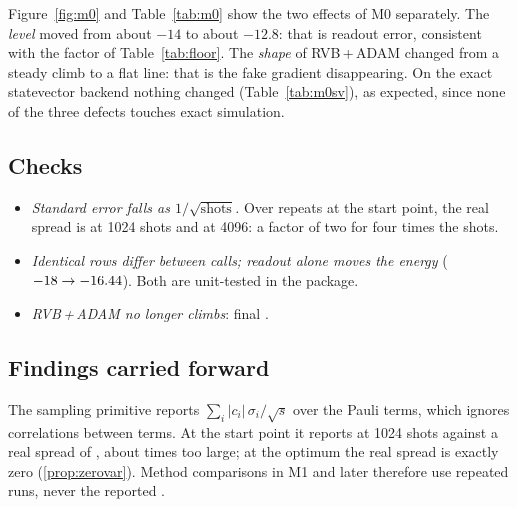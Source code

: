 Figure~\ref{fig:m0} and Table~\ref{tab:m0} show the two effects of M0 separately. The
\emph{level} moved from about $-14$ to about $-12.8$: that is readout error, consistent with the
factor \VKeepHvaReadout{} of Table~\ref{tab:floor}. The \emph{shape} of RVB\,+\,ADAM changed from
a steady climb to a flat line: that is the fake gradient disappearing. On the exact
statevector backend nothing changed (Table~\ref{tab:m0sv}), as expected, since none of the three
defects touches exact simulation.

\begin{table}[H]
  \centering
  
  \caption{Exact statevector benchmark, for reference. HVA returns to zero parameters exactly;
    RVB with SPSA stops at \VSvErrRvbSpsa.}
  \label{tab:m0sv}
\end{table}

\subsection{Checks}

\begin{itemize}
  \item \emph{Standard error falls as $1/\sqrt{\text{shots}}$.} Over \VSpreadRepeats{} repeats at
    the start point, the real spread is \VSpreadLowReal{} at 1024 shots and \VSpreadHighReal{} at
    4096: a factor of two for four times the shots.
  \item \emph{Identical rows differ between calls; readout alone moves the energy}
    ($-18\to-16.44$). Both are unit-tested in the package.
  \item \emph{RVB\,+\,ADAM no longer climbs}: final \VPostFinalRvbAdam.
\end{itemize}

\subsection{Findings carried forward}

\begin{rem}\label{rem:stdbound}
  The sampling primitive reports $\sum_i|c_i|\,\sigma_i/\sqrt{s}$ over the Pauli terms, which
  ignores correlations between terms. At the start point it reports \VSpreadLowReported{} at
  1024 shots against a real spread of \VSpreadLowReal{}, about \VSpreadRatio{} times too large;
  at the optimum the real spread is exactly zero (\cref{prop:zerovar}). Method comparisons in M1
  and later therefore use repeated runs, never the reported .
\end{rem}

